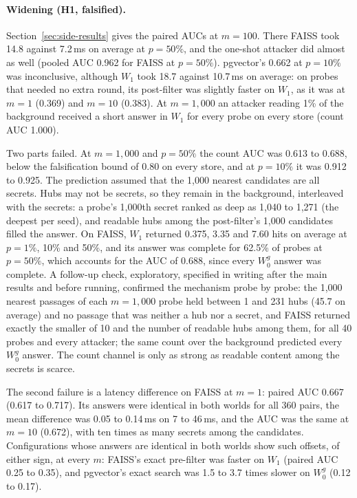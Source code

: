 \paragraph{Widening (H1, falsified).}
Section~\ref{sec:side-results} gives the paired AUCs at $m = 100$. There FAISS took 14.8 against 7.2\,ms on average at $p = 50\%$, and the
one-shot attacker did almost as well (pooled AUC 0.962 for FAISS at $p = 50\%$). pgvector's 0.662
at $p = 10\%$ was inconclusive, although $W_1$ took 18.7 against 10.7\,ms on average:
on probes that needed no extra round, its post-filter was slightly faster on $W_1$, as it was at
$m = 1$ (0.369) and $m = 10$ (0.383). At
$m = 1{,}000$ an attacker reading 1\% of the background received a short answer in $W_1$ for every
probe on every store (count AUC 1.000).

Two parts failed. At $m = 1{,}000$ and $p = 50\%$ the count AUC was 0.613 to 0.688, below the
falsification bound of 0.80 on every store, and at $p = 10\%$ it was 0.912 to 0.925. The prediction
assumed that the 1,000 nearest candidates are all secrets. Hubs may not be secrets, so they remain in
the background, interleaved with the secrets: a probe's 1,000th secret ranked as deep as 1,040 to
1,271 (the deepest per seed), and readable hubs among the post-filter's 1,000 candidates filled the
answer. On FAISS, $W_1$ returned 0.375, 3.35 and 7.60 hits on average at $p = 1\%$, 10\% and 50\%, and
its answer was complete for 62.5\% of probes at $p = 50\%$, which accounts for the AUC of 0.688, since
every $W_0^g$ answer was complete. A follow-up check, exploratory, specified in writing after the
main results and before running, confirmed the mechanism probe by probe: the 1,000 nearest passages of each
$m = 1{,}000$ probe held between 1 and 231 hubs (45.7 on average) and no passage that was neither a
hub nor a secret, and FAISS returned exactly the smaller of 10 and the number of readable hubs among
them, for all 40 probes and every attacker; the same count over the background predicted every
$W_0^g$ answer. The count channel is only as strong as readable content among the secrets is scarce.

The second failure is a latency difference on FAISS at $m = 1$: paired AUC 0.667 (0.617 to 0.717).
Its answers were identical in both worlds for all 360 pairs, the mean difference was 0.05 to 0.14\,ms
on 7 to 46\,ms, and the AUC was the same at $m = 10$ (0.672), with ten times as many secrets among the
candidates. Configurations whose answers are identical in both worlds show such offsets, of either
sign, at every $m$: FAISS's exact pre-filter was faster on $W_1$ (paired AUC 0.25 to 0.35), and
pgvector's exact search was 1.5 to 3.7 times slower on $W_0^g$ (0.12 to 0.17).

